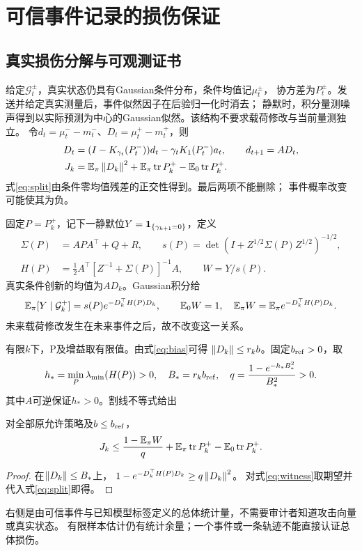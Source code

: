 \section{可信事件记录的损伤保证}
\subsection{真实损伤分解与可观测证书}
给定$\mathcal G_t^\pm$，真实状态仍具有Gaussian条件分布，条件均值记$\mu_t^\pm$，
协方差为$P_t^\pm$。发送并给定真实测量后，事件似然因子在后验归一化时消去；
静默时，积分量测噪声得到以实际预测为中心的Gaussian似然。该结构不要求载荷修改与当前量测独立。
令$d_t=\mu_t^--m_t^-$、$D_t=\mu_t^+-m_t^+$，则
\begin{align}
D_t&=(I-K_{\gamma_t}(P_t^-))d_t-\gamma_tK_1(P_t^-)a_t,\qquad
d_{t+1}=AD_t,\label{eq:bias}\\
J_k&=\mathbb E_\pi\left\|D_k\right\|^2+
\mathbb E_\pi\operatorname{tr} P_k^+-\mathbb E_0\operatorname{tr} P_k^+.\label{eq:split}
\end{align}
式\eqref{eq:split}由条件零均值残差的正交性得到。最后两项不能删除；
事件概率改变可能使其为负。

固定$P=P_k^+$，记下一静默位$Y=\mathbf 1_{\{\gamma_{k+1}=0\}}$，定义
\begin{align}
\Sigma(P)&=APA^\top+Q+R,\qquad
s(P)=\det(I+Z^{1/2}\Sigma(P)Z^{1/2})^{-1/2},\nonumber\\
H(P)&=\tfrac12 A^\top[Z^{-1}+\Sigma(P)]^{-1}A,\qquad
W=Y/s(P).
\end{align}
真实条件创新的均值为$AD_k$。Gaussian积分给
\begin{equation}
\mathbb E_\pi[Y\mid\mathcal G_k^+]=s(P)e^{-D_k^\top H(P)D_k},
\qquad \mathbb E_0W=1,\quad \mathbb E_\pi W=\mathbb E_\pi e^{-D_k^\top H(P)D_k}.
\label{eq:witness}
\end{equation}
未来载荷修改发生在未来事件之后，故不改变这一关系。

有限$k$下，P及增益取有限值。由式\eqref{eq:bias}可得
$\left\|D_k\right\|\le r_kb$。固定$b_{\rm ref}>0$，取
\[
h_*=\min_P\lambda_{\min}(H(P))>0,\quad
B_*=r_kb_{\rm ref},\quad q=\frac{1-e^{-h_*B_*^2}}{B_*^2}>0.
\]
其中$A$可逆保证$h_*>0$。割线不等式给出
\begin{proposition}[可信下一事件的总体损伤证书]
对全部原允许策略及$b\le b_{\rm ref}$，
\begin{equation}
J_k\le \frac{1-\mathbb E_\pi W}{q}
+\mathbb E_\pi\operatorname{tr} P_k^+-\mathbb E_0\operatorname{tr} P_k^+.
\label{eq:certificate}
\end{equation}
\end{proposition}
\begin{proof}
在$\left\|D_k\right\|\le B_*$上，
$1-e^{-D_k^\top H(P)D_k}\ge q\left\|D_k\right\|^2$。
对式\eqref{eq:witness}取期望并代入式\eqref{eq:split}即得。
\end{proof}
右侧是由可信事件与已知模型标签定义的总体统计量，不需要审计者知道攻击向量或真实状态。
有限样本估计仍有统计余量；一个事件或一条轨迹不能直接认证总体损伤。


